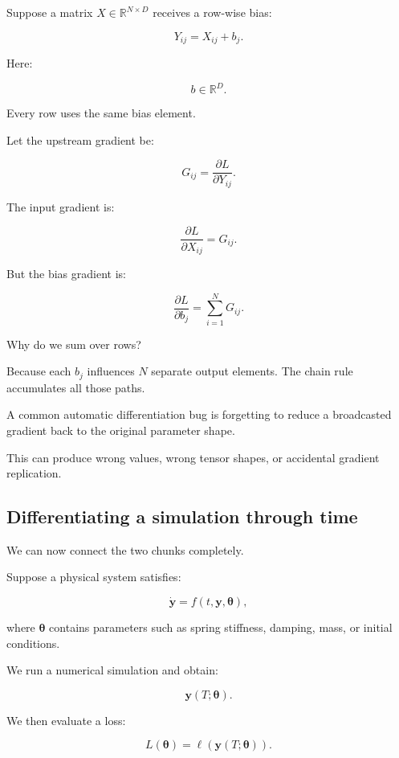 \hypertarget{02-foundations-ii-ch022-broadcasting-requires-gradient-reduction}{}

Suppose a matrix \(X\in\mathbb R^{N\times D}\) receives a row-wise bias:

\[
Y_{ij}=X_{ij}+b_j.
\]

Here:

\[
b\in\mathbb R^D.
\]

Every row uses the same bias element.

Let the upstream gradient be:

\[
G_{ij}=\frac{\partial L}{\partial Y_{ij}}.
\]

The input gradient is:

\[
\frac{\partial L}{\partial X_{ij}}=G_{ij}.
\]

But the bias gradient is:

\[
\boxed{ \frac{\partial L}{\partial b_j} = \sum_{i=1}^{N}G_{ij} }.
\]

Why do we sum over rows?

Because each \(b_j\) influences \(N\) separate output elements. The chain rule accumulates all those paths.

A common automatic differentiation bug is forgetting to reduce a broadcasted gradient back to the original parameter shape.

This can produce wrong values, wrong tensor shapes, or accidental gradient replication.

\subsection{Differentiating a simulation through time}\label{02-foundations-ii-ch022-differentiating-a-simulation-through-time}

\hypertarget{02-foundations-ii-ch022-differentiating-a-simulation-through-time}{}

We can now connect the two chunks completely.

Suppose a physical system satisfies:

\[
\dot{\mathbf y}=f(t,\mathbf y,\boldsymbol\theta),
\]

where \(\boldsymbol\theta\) contains parameters such as spring stiffness, damping, mass, or initial conditions.

We run a numerical simulation and obtain:

\[
\mathbf y(T;\boldsymbol\theta).
\]

We then evaluate a loss:

\[
L(\boldsymbol\theta) = \ell(\mathbf y(T;\boldsymbol\theta)).
\]

